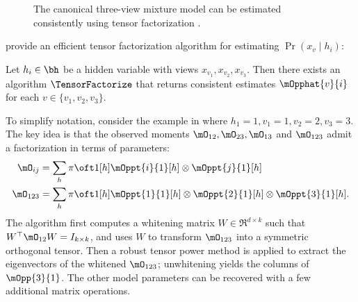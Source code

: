 
\begin{figure}[t]
  \label{fig:three-view}
  \centering
  
  \caption{The canonical three-view mixture model can be estimated consistently
  using tensor factorization \citep{anandkumar13tensor}.}
\end{figure}

\citet{anandkumar12moments} provide an efficient tensor factorization algorithm
for estimating $\Pr(x_v \mid h_i)$:
\begin{theorem}
Let $h_i \in \bh$ be a hidden variable
with views $x_{v_1},x_{v_2},x_{v_3}$.
Then there exists an algorithm $\TensorFactorize$ that
returns consistent estimates $\mOpphat{v}{i}$ for each $v \in \{v_1,v_2,v_3\}$.
\end{theorem}


To simplify notation, consider the example in  where $h_1=1,v_1=1,v_2=2,v_3=3$.
The key idea is that the observed moments $\mO_{12}, \mO_{23}, \mO_{13}$ and
  $\mO_{123}$ admit a factorization in terms of parameters:
\begin{align*}
  \mO_{ij} &= \sum_h {\pi \oft 1}[h] {\mOppt{i}{1}}[h] \otimes {\mOppt{j}{1}}[h] \\ %
  \mO_{123} &= \sum_h {\pi \oft 1}[h] {\mOppt{1}{1}}[h] \otimes {\mOppt{2}{1}}[h] \otimes  {\mOppt{3}{1}}[h].
\end{align*}
The algorithm first computes a whitening matrix $W \in
  \Re^{d \times k}$ such that $W^\top \mO_{12} W = I_{k \times k}$,
  and uses $W$ to transform $\mO_{123}$ into a symmetric orthogonal tensor.  
Then a robust tensor power method is applied to extract the eigenvectors
of the whitened $\mO_{123}$; unwhitening yields the columns of $\mOpp{3}{1}$.
The other model parameters can be recovered with a few additional matrix operations.

